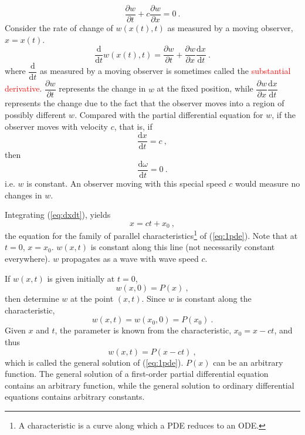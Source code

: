 \documentclass[12pt,a4paper]{article}
\newcommand{\dif}{\mathrm{d}}
\begin{document}
\cite{haberman2013applied} \begin{equation}
\dfrac{\partial w}{\partial t} +c\dfrac{\partial w}{\partial x} = 0 ~.
\label{eq:1pde}
\end{equation}
Consider the rate of change of $w(x(t),t)$ as measured by a moving observer, $x = x(t)$.
\begin{equation}
\dfrac{\dif }{\dif t}w(x(t),t) = \dfrac{\partial w}{\partial t} + \dfrac{\partial w}{\partial x} \dfrac{\dif x}{\dif t} ~.
\end{equation}
where $\dfrac{\dif}{\dif t}$ as measured by a moving observer is sometimes called the \textcolor{red}{substantial derivative}. $\dfrac{\partial w}{\partial t}$ represents the change in $w$ at the fixed position, while $\dfrac{\partial w}{\partial x} \dfrac{\dif x}{\dif t}$ represents the change due to the fact that the observer moves into a region of possibly different $w$. Compared with the partial differential equation for $w$, if the observer moves with velocity $c$, that is, if
\begin{equation}
\dfrac{\dif x}{\dif t} = c ~,
\label{eq:dxdt}
\end{equation}
then
\begin{equation}
\dfrac{\dif \omega}{\dif t} = 0 ~.
\end{equation}
i.e. $w$ is constant. An observer moving with this special speed $c$ would measure no changes in $w$.

Integrating (\ref{eq:dxdt}), yields
\begin{equation}
x = ct +x_0 ~,
\end{equation}
the equation for the family of parallel characteristics\footnote{A characteristic is a curve along which a PDE reduces to an ODE.} of (\ref{eq:1pde}). Note that at $t = 0$, $x = x_0$. $w(x,t)$ is constant along this line (not necessarily constant everywhere). $w$ propagates as a wave with wave speed $c$. 

If $w(x, t)$ is given initially at $t = 0$,
\begin{equation}
w(x, 0) = P(x) ~,
\end{equation}
then  determine $w$ at the point $(x, t)$. Since $w$ is constant along the characteristic,
\begin{equation}
w(x, t) = w(x_0, 0) = P(x_0) ~.
\end{equation}
Given $x$ and $t$, the parameter is known from the characteristic, $x_0 = x - ct$, and thus
\begin{equation}
w(x,t) = P(x-ct) ~,
\end{equation}
which is called the general solution of (\ref{eq:1pde}). $P(x)$ can be an arbitrary function. The general solution of a first-order partial differential equation contains an arbitrary function, while the general solution to ordinary differential equations contains arbitrary constants.
\end{document}
